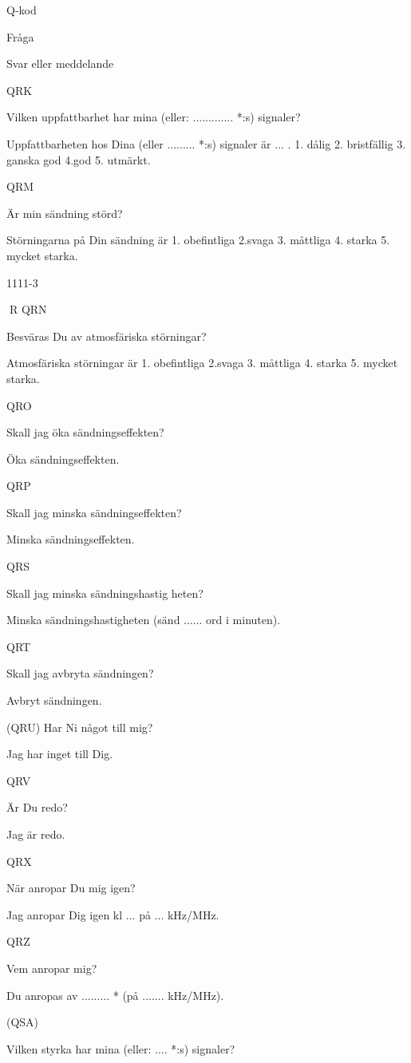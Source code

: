 \documentclass[a4paper,twoside,twocolumn,openright]{book}
\begin{document}
{{{{{Q-kod

Fråga

Svar eller meddelande

QRK

Vilken uppfattbarhet har mina
(eller: ............. *:s) signaler?

Uppfattbarheten hos Dina
(eller ......... *:s) signaler är ... .
1. dålig
2. bristfällig
3. ganska god
4.god
5. utmärkt.

QRM

Är min sändning störd?

Störningarna på Din sändning är
1. obefintliga
2.svaga
3. måttliga
4. starka
5. mycket starka.

1111-3

R
QRN

Besväras Du av atmosfäriska
störningar?

Atmosfäriska störningar är
1. obefintliga
2.svaga
3. måttliga
4. starka
5. mycket starka.

QRO

Skall jag öka sändningseffekten?

Öka sändningseffekten.

QRP

Skall jag minska sändningseffekten?

Minska sändningseffekten.

QRS

Skall jag minska sändningshastig heten?

Minska sändningshastigheten
(sänd ...... ord i minuten).

QRT

Skall jag avbryta sändningen?

Avbryt sändningen.

(QRU) Har Ni något till mig?

Jag har inget till Dig.

QRV

Är Du redo?

Jag är redo.

QRX

När anropar Du mig igen?

Jag anropar Dig igen kl ... på ... kHz/MHz.

QRZ

Vem anropar mig?

Du anropas av ......... * (på ....... kHz/MHz).

(QSA)

Vilken styrka har mina
(eller: .... *:s) signaler?

}}}}}
\end{document}
